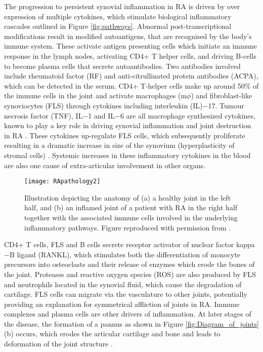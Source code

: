 \documentclass[twoside]{bhamthesis}
\theoremstyle{definition}
\begin{document}
The progression to persistent synovial inflammation in RA is driven by over expression of multiple cytokines, which stimulate biological inflammatory cascades outlined in Figure \ref{fig:pathways}. Abnormal post-transcriptional modifications result in modified autoantigens, that are recognised by the body's immune system. These activate antigen presenting cells which initiate an immune response in the lymph nodes, activating CD4+ T helper cells, and driving B-cells to become plasma cells that secrete autoantibodies. Two antibodies involved include rheumatoid factor (RF) and anti-citrullinated protein antibodies (ACPA), which can be detected in the serum. CD4+ T-helper cells make up around 50\% of the immune cells in the joint and activate macrophages (m$\phi$) and fibroblast-like synoviocytes (FLS) through cytokines including interleukin (IL)$-$17. Tumour necrosis factor (TNF), IL$-$1 and IL$-$6 are all macrophage synthesized cytokines, known to play a key role in driving synovial inflammation and joint destruction in RA \cite{scott2010RA}. These cytokines up-regulate FLS cells, which subsequently proliferate resulting in a dramatic increase in size of the synovium (hyperplasticity of stromal cells) \cite{bartok2010fibroblast}. Systemic increases in these inflammatory cytokines in the blood are also one cause of extra-articular involvement in other organs. 

\begin{figure}[!ht]
\centering
  \centering
  \texttt{[image: RApathology2]}
\caption[Illustration depicting the anatomy of (a) a healthy joint in the left half, and (b) an inflamed joint of a patient with RA in the right half together with the associated immune cells involved in the underlying inflammatory pathways.]{Illustration depicting the anatomy of (a) a healthy joint in the left half, and (b) an inflamed joint of a patient with RA in the right half together with the associated immune cells involved in the underlying inflammatory pathways. Figure reproduced with permission from \cite{strand2007biologic}.}
  \label{fig:RApathology2}
\end{figure}

CD4+ T cells, FLS and B cells secrete receptor activator of nuclear factor kappa$-$B ligand (RANKL), which stimulates both the differentiation of monocyte precursors into osteoclasts and their release of enzymes which erode the bones of the joint. Proteases and reactive oxygen species (ROS) are also produced by FLS and neutrophils located in the synovial fluid, which cause the degradation of cartilage. FLS cells can migrate via the vasculature to other joints, potentially providing an explanation for symmetrical affliction of joints in RA. Immune complexes and plasma cells are other drivers of inflammation. At later stages of the disease, the formation of a pannus as shown in Figure \ref{fig:Diagram_of_joints}(b) occurs, which erodes the articular cartilage and bone and leads to deformation of the joint structure \cite{scott1986long}.
\end{document}
